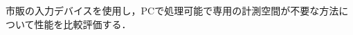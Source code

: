 \documentclass[titlepage]{jarticle}
\begin{document}
市販の入力デバイスを使用し，PCで処理可能で専用の計測空間が不要な方法について性能を比較評価する．
\end{document}

